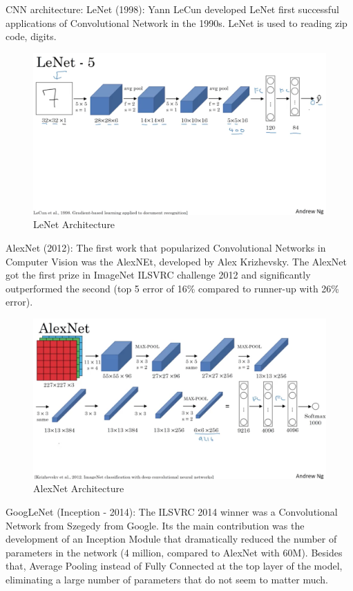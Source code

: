CNN architecture:
LeNet (1998): Yann LeCun developed LeNet first successful applications of Convolutional Network in the 1990s. LeNet is used to reading zip code, digits.
\begin{center}
  \begin{figure}[H]
  \centering
  \includegraphics[width=1\columnwidth]{images/chap2/LeNet.png}
  \caption{LeNet Architecture}
  \label{chap2:WSP}
  \end{figure}
\end{center}
AlexNet (2012): The first work that popularized Convolutional Networks in Computer Vision was the AlexNEt, developed by Alex Krizhevsky. The AlexNet got the first prize in ImageNet ILSVRC challenge 2012 and significantly outperformed the second (top 5 error of 16\% compared to runner-up with 26\% error).  
\begin{center}
  \begin{figure}[H]
  \centering
  \includegraphics[width=1\columnwidth]{images/chap2/AlexNet.png}
  \caption{AlexNet Architecture}
  \label{chap2:WSP}
  \end{figure}
\end{center}
GoogLeNet (Inception - 2014): The ILSVRC 2014 winner was a Convolutional Network from Szegedy from Google. Its the main contribution was the development of an Inception Module that dramatically reduced the number of parameters in the network (4 million, compared to AlexNet with 60M). Besides that, Average Pooling instead of Fully Connected at the top layer of the model, eliminating a large number of parameters that do not seem to matter much.
